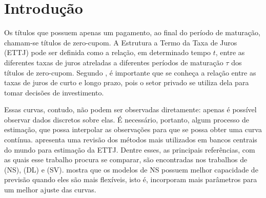 \documentclass[
	12pt,				%
	openright,			%
	oneside,			%
	a4paper,			%
	english,			%
	brazil				%
	]{dissertacao-ufrgs-abntex2}
\begin{document}
\tableofcontents*
\cleardoublepage



\textual

\chapter*[Introdução]{Introdução}


Os títulos que possuem apenas um pagamento, ao final do período de
maturação, chamam-se títulos de zero-cupom. A Estrutura a Termo da
Taxa de Juros (ETTJ) pode ser definida como a relação, em determinado tempo $t$, entre as diferentes taxas de juros atreladas
a diferentes períodos de maturação $\tau$ dos títulos de zero-cupom.
Segundo , é importante que se conheça a relação
entre as taxas de juros de curto e longo prazo, pois o setor privado
se utiliza dela para tomar decisões de investimento.

Essas curvas, contudo, não podem ser observadas diretamente: apenas é possível observar dados discretos sobre elas. É necessário, portanto, algum
processo de estimação, que possa interpolar as observações para que
se possa obter uma curva contínua.   apresenta
uma revisão dos métodos mais utilizados em bancos centrais do mundo
para estimação da ETTJ. Dentre esses, as principais referências, com
as quais esse trabalho procura se comparar, são encontradas nos trabalhos 
de (NS), 
(DL) e (SV).
 mostra que os modelos de NS possuem
melhor capacidade de previsão quando eles são mais flexíveis, isto é, incorporam mais parâmetros para um melhor ajuste das curvas.
\end{document}
